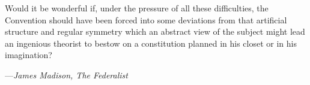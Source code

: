 \newpage 

\null
\vskip 1in

\begingroup
\raggedright
\list{}{\rightmargin=8pc \leftmargin=8pc}\item[] \small
Would it be wonderful if, under the pressure of all these difficulties,
the Convention should have been forced into some deviations from that
artificial structure and regular symmetry which an abstract view of the
subject might lead an ingenious theorist to bestow on a constitution
planned in his closet or in his imagination?
\par\vskip 4pt
\begin{tabbing}
---\={\it James Madison, The Federalist} \\
\end{tabbing}
\endlist
\endgroup

